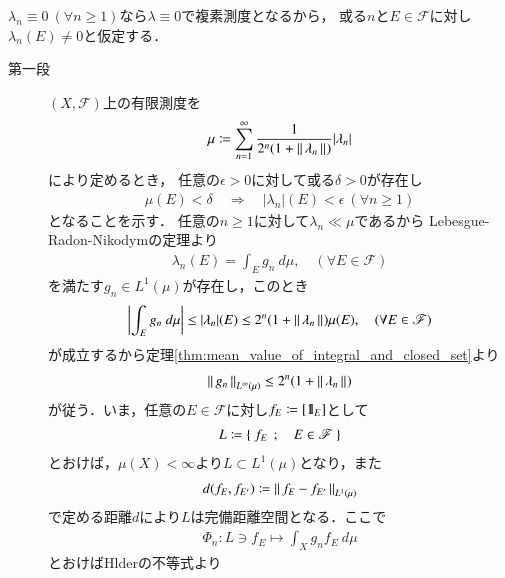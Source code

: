 	\begin{prf}$\lambda_n \equiv 0\ (\forall n \geq 1)$なら$\lambda \equiv 0$で複素測度となるから，
		或る$n$と$E \in \mathscr{F}$に対し$\lambda_n(E) \neq 0$と仮定する．
		\begin{description}
			\item[第一段] $(X,\mathscr{F})$上の有限測度を
				\begin{align}
					\mu \coloneqq \sum_{n=1}^\infty \frac{1}{2^n(1 + \left\|\, \lambda_n\, \right\|_{})} |\lambda_n|
				\end{align}
				により定めるとき，%
				任意の$\epsilon > 0$に対して或る$\delta > 0$が存在し
				\begin{align}
					\mu(E) < \delta \quad \Rightarrow \quad |\lambda_n|(E) < \epsilon\ (\forall n \geq 1)
					\label{eq:thm_Vitali_Hahn_Saks_2}
				\end{align}
				となることを示す．
				任意の$n \geq 1$に対して$\lambda_n \ll \mu$であるから
				Lebesgue-Radon-Nikodymの定理より
				\begin{align}
					\lambda_n(E) = \int_E g_n\ d\mu,
					\quad (\forall E \in \mathscr{F})
				\end{align}
				を満たす$g_n \in L^1(\mu)$が存在し，このとき
				\begin{align}
					\left| \int_E g_n\ d\mu \right|
					\leq |\lambda_n|(E)
					\leq 2^n(1+\left\|\, \lambda_n\, \right\|_{})\mu(E),
					\quad (\forall E \in \mathscr{F})
				\end{align}
				が成立するから定理\ref{thm:mean_value_of_integral_and_closed_set}より
				\begin{align}
					\left\|\, g_n\, \right\|_{L^\infty(\mu)} \leq 2^n(1+\left\|\, \lambda_n\, \right\|_{})
				\end{align}
				が従う．いま，任意の$E \in \mathscr{F}$に対し$f_E \coloneqq [\mbox{1}\hspace{-0.25em}\mbox{l}_E]$として
				\begin{align}
					L \coloneqq \left\{\ f_E\ \, ; \quad E \in \mathscr{F}\ \right\}
				\end{align}
				とおけば，$\mu(X) < \infty$より$L \subset L^1(\mu)$となり，また
				\begin{align}
					d(f_E,f_{E'}) \coloneqq \left\|\, f_E - f_{E'}\, \right\|_{L^1(\mu)}
				\end{align}
				で定める距離$d$により$L$は完備距離空間となる．ここで
				\begin{align}
					\Phi_n: L \ni f_E \longmapsto \int_X g_n f_E\ d\mu
				\end{align}
				とおけばHlderの不等式より
				\begin{align}

\end{align}
\end{description}
\end{prf}
